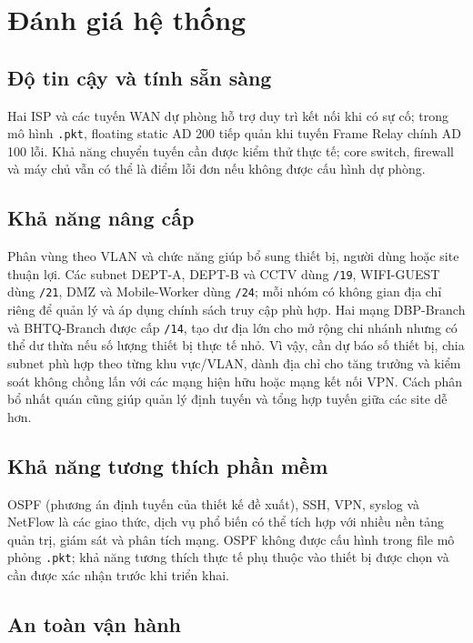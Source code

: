 \section{Đánh giá hệ thống}

\subsection{Độ tin cậy và tính sẵn sàng}

Hai ISP và các tuyến WAN dự phòng hỗ trợ duy trì kết nối khi có sự cố; trong mô hình \texttt{.pkt}, floating static AD 200 tiếp quản khi tuyến Frame Relay chính AD 100 lỗi. Khả năng chuyển tuyến cần được kiểm thử thực tế; core switch, firewall và máy chủ vẫn có thể là điểm lỗi đơn nếu không được cấu hình dự phòng.

\subsection{Khả năng nâng cấp}

Phân vùng theo VLAN và chức năng giúp bổ sung thiết bị, người dùng hoặc site thuận lợi. Các subnet DEPT-A, DEPT-B và CCTV dùng \texttt{/19}, WIFI-GUEST dùng \texttt{/21}, DMZ và Mobile-Worker dùng \texttt{/24}; mỗi nhóm có không gian địa chỉ riêng để quản lý và áp dụng chính sách truy cập phù hợp. Hai mạng DBP-Branch và BHTQ-Branch được cấp \texttt{/14}, tạo dư địa lớn cho mở rộng chi nhánh nhưng có thể dư thừa nếu số lượng thiết bị thực tế nhỏ. Vì vậy, cần dự báo số thiết bị, chia subnet phù hợp theo từng khu vực/VLAN, dành địa chỉ cho tăng trưởng và kiểm soát không chồng lấn với các mạng hiện hữu hoặc mạng kết nối VPN. Cách phân bổ nhất quán cũng giúp quản lý định tuyến và tổng hợp tuyến giữa các site dễ hơn.

\subsection{Khả năng tương thích phần mềm}

OSPF (phương án định tuyến của thiết kế đề xuất), SSH, VPN, syslog và NetFlow là các giao thức, dịch vụ phổ biến có thể tích hợp với nhiều nền tảng quản trị, giám sát và phân tích mạng. OSPF không được cấu hình trong file mô phỏng \texttt{.pkt}; khả năng tương thích thực tế phụ thuộc vào thiết bị được chọn và cần được xác nhận trước khi triển khai.

\subsection{An toàn vận hành}

